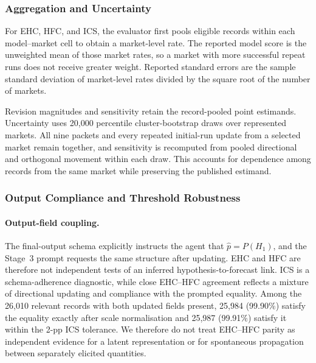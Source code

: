 \subsubsection{Aggregation and Uncertainty}
\label{app:aggregation}

For EHC, HFC, and ICS, the evaluator first pools eligible records within each
model--market cell to obtain a market-level rate.  The reported model score is the
unweighted mean of those market rates, so a market with more successful repeat runs
does not receive greater weight.  Reported standard errors are the sample standard
deviation of market-level rates divided by the square root of the number of markets.

Revision magnitudes and sensitivity retain the record-pooled point estimands.
Uncertainty uses 20,000 percentile cluster-bootstrap draws over represented markets.
All nine packets and every repeated initial-run update from a selected market remain
together, and sensitivity is recomputed from pooled directional and orthogonal
movement within each draw. This accounts for dependence among records from the same
market while preserving the published estimand.

\subsubsection{Output Compliance and Threshold Robustness}
\label{app:exp1-threshold-robustness}

\paragraph{Output-field coupling.}
The final-output schema explicitly instructs the agent that
$\hat p=P(H_1)$, and the Stage~3 prompt requests the same structure after
updating. EHC and HFC are therefore not independent tests of an inferred
hypothesis-to-forecast link. ICS is a schema-adherence diagnostic, while close
EHC--HFC agreement reflects a mixture of directional updating and compliance
with the prompted equality. Among the 26,010 relevant records with both updated
fields present, 25,984 (99.90\%) satisfy the equality exactly after scale
normalisation and 25,987 (99.91\%) satisfy it within the 2-pp ICS tolerance. We
therefore do not treat EHC--HFC parity as independent evidence for a latent
representation or for spontaneous propagation between separately elicited
quantities.

